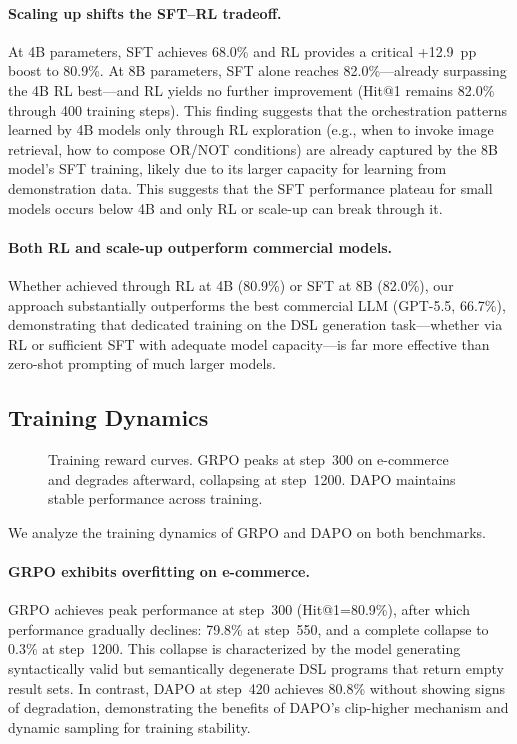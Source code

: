 \documentclass[11pt]{article}
\begin{document}
\paragraph{Scaling up shifts the SFT--RL tradeoff.}
At 4B parameters, SFT achieves 68.0\% and RL provides a critical +12.9~pp boost to 80.9\%. At 8B parameters, SFT alone reaches 82.0\%---already surpassing the 4B RL best---and RL yields no further improvement (Hit@1 remains 82.0\% through 400 training steps).
This finding suggests that the orchestration patterns learned by 4B models only through RL exploration (e.g., when to invoke image retrieval, how to compose OR/NOT conditions) are already captured by the 8B model's SFT training, likely due to its larger capacity for learning from demonstration data.
This suggests that the SFT performance plateau for small models occurs below 4B and only RL or scale-up can break through it.

\paragraph{Both RL and scale-up outperform commercial models.}
Whether achieved through RL at 4B (80.9\%) or SFT at 8B (82.0\%), our approach substantially outperforms the best commercial LLM (GPT-5.5, 66.7\%), demonstrating that dedicated training on the DSL generation task---whether via RL or sufficient SFT with adequate model capacity---is far more effective than zero-shot prompting of much larger models.


\subsection{Training Dynamics}
\label{sec:training}

\begin{figure}[t]
\centering
\caption{Training reward curves. GRPO peaks at step~300 on e-commerce and degrades afterward, collapsing at step~1200. DAPO maintains stable performance across training.}
\label{fig:training_curve}
\end{figure}

We analyze the training dynamics of GRPO and DAPO on both benchmarks.

\paragraph{GRPO exhibits overfitting on e-commerce.}
GRPO achieves peak performance at step~300 (Hit@1=80.9\%), after which performance gradually declines: 79.8\% at step~550, and a complete collapse to 0.3\% at step~1200. This collapse is characterized by the model generating syntactically valid but semantically degenerate DSL programs that return empty result sets. In contrast, DAPO at step~420 achieves 80.8\% without showing signs of degradation, demonstrating the benefits of DAPO's clip-higher mechanism and dynamic sampling for training stability.
\end{document}
